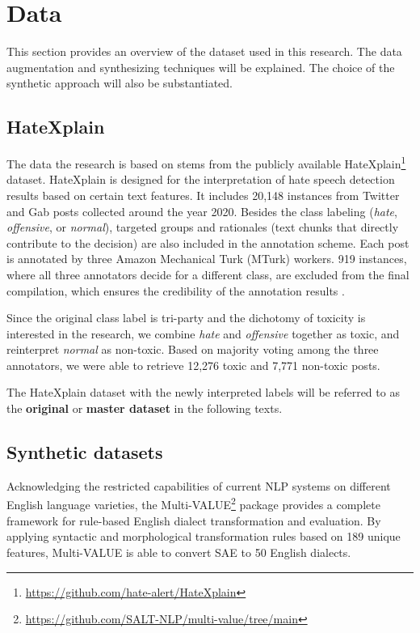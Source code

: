 \documentclass[11pt]{article}
\begin{document}
\section{Data}

This section provides an overview of the dataset used in this research. The data augmentation and synthesizing techniques will be explained. The choice of the synthetic approach will also be substantiated.

\subsection{HateXplain} \label{hatexplain-data}

The data the research is based on stems from the publicly available HateXplain\footnote{\url{https://github.com/hate-alert/HateXplain}} dataset. HateXplain is designed for the interpretation of hate speech detection results based on certain text features. It includes 20,148 instances from Twitter and Gab posts collected around the year 2020. Besides the class labeling (\textit{hate}, \textit{offensive}, or \textit{normal}), targeted groups and rationales (text chunks that directly contribute to the decision) are also included in the annotation scheme. Each post is annotated by three Amazon Mechanical Turk (MTurk) workers. 919 instances, where all three annotators decide for a different class, are excluded from the final compilation, which ensures the credibility of the annotation results \citep{mathew-2021-hatexplain}.

Since the original class label is tri-party and the dichotomy of toxicity is interested in the research, we combine \textit{hate} and \textit{offensive} together as toxic, and reinterpret \textit{normal} as non-toxic. Based on majority voting among the three annotators, we were able to retrieve 12,276 toxic and 7,771 non-toxic posts.

The HateXplain dataset with the newly interpreted labels will be referred to as the \textbf{original} or \textbf{master dataset} in the following texts.

\subsection{Synthetic datasets}

Acknowledging the restricted capabilities of current NLP systems on different English language varieties, the Multi-VALUE\footnote{\url{https://github.com/SALT-NLP/multi-value/tree/main}} package \citep{ziems-2023-multi} provides a complete framework for rule-based English dialect transformation and evaluation. By applying syntactic and morphological transformation rules based on 189 unique features, Multi-VALUE is able to convert SAE to 50 English dialects.
\end{document}
